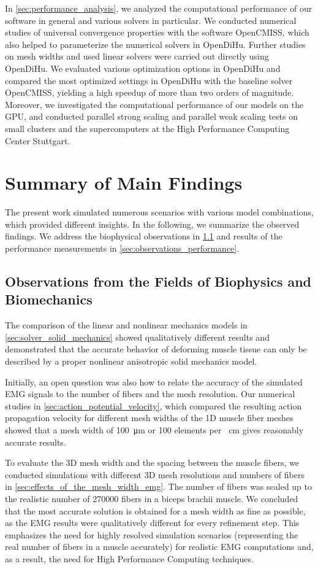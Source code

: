 In \cref{sec:performance_analysis}, we analyzed the computational performance of our software in general and various solvers in particular. We conducted numerical studies of universal convergence properties with the software OpenCMISS, which also helped to parameterize the numerical solvers in OpenDiHu. Further studies on mesh widths and used linear solvers were carried out directly using OpenDiHu. We evaluated various optimization options in OpenDiHu and compared the most optimized settings in OpenDiHu with the baseline solver OpenCMISS, yielding a high speedup of more than two orders of magnitude. Moreover, we investigated the computational performance of our models on the GPU, and conducted parallel strong scaling and parallel weak scaling tests on small clusters and the supercomputers at the High Performance Computing Center Stuttgart.

\section{Summary of Main Findings}

The present work simulated numerous scenarios with various model combinations, which provided different insights. In the following, we summarize the observed findings. We address the biophysical observations in \cref{sec:observations_biophysics} and results of the performance measurements in \cref{sec:observations_performance}.

\subsection{Observations from the Fields of Biophysics and Biomechanics}\label{sec:observations_biophysics}
The comparison of the linear and nonlinear mechanics models in \cref{sec:solver_solid_mechanics} showed qualitatively different results and demonstrated that the accurate behavior of deforming muscle tissue can only be described by a proper nonlinear anisotropic solid mechanics model. 

Initially, an open question was also how to relate the accuracy of the simulated EMG signals to the number of fibers and the mesh resolution. Our numerical studies in \cref{sec:action_potential_velocity}, which compared the resulting action propagation velocity for different mesh widths of the 1D muscle fiber meshes showed that a mesh width of \SI{100}{\micro\meter} or 100 elements per \SI{}{\centi\meter} gives reasonably accurate results. 

To evaluate the 3D mesh width and the spacing between the muscle fibers, we conducted simulations with different 3D mesh resolutions and numbers of fibers in \cref{sec:effects_of_the_mesh_width_emg}. The number of fibers was scaled up to the realistic number of \num{270000} fibers in a biceps brachii muscle. We concluded that the most accurate solution is obtained for a mesh width as fine as possible, as the EMG results were qualitatively different for every refinement step. This emphasizes the need for highly resolved simulation scenarios (representing the real number of fibers in a muscle accurately) for realistic EMG computations and, as a result, the need for High Performance Computing techniques.

